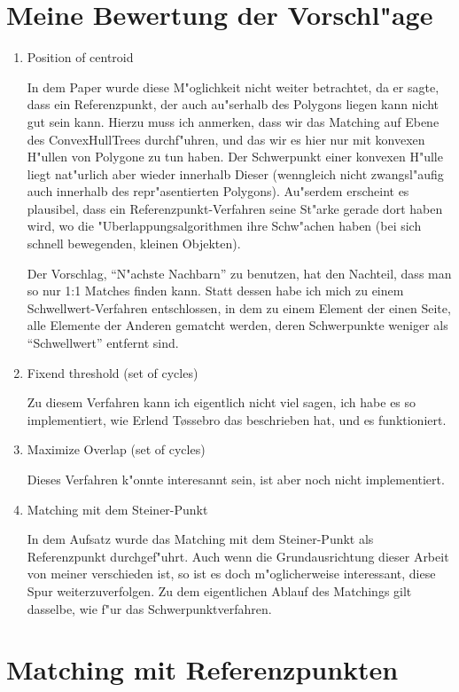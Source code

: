 \section{Meine Bewertung der Vorschl"age}
\begin{enumerate}
\item Position of centroid

In dem Paper wurde diese M"oglichkeit nicht weiter betrachtet, da er sagte, dass ein Referenzpunkt, der auch au"serhalb des Polygons liegen kann nicht gut sein kann. Hierzu muss ich anmerken, dass wir das Matching auf Ebene des ConvexHullTrees durchf"uhren, und das wir es hier nur mit konvexen H"ullen von Polygone zu tun haben. Der Schwerpunkt einer konvexen H"ulle liegt nat"urlich aber wieder innerhalb Dieser (wenngleich nicht zwangsl"aufig auch innerhalb des repr"asentierten Polygons). Au"serdem erscheint es plausibel, dass ein Referenzpunkt-Verfahren seine St"arke gerade dort haben wird, wo die "Uberlappungsalgorithmen ihre Schw"achen haben (bei sich schnell bewegenden, kleinen Objekten).

Der Vorschlag, "`N"achste Nachbarn"' zu benutzen, hat den Nachteil, dass man so nur 1:1 Matches finden kann. Statt dessen habe ich mich zu einem Schwellwert-Verfahren entschlossen, in dem zu einem Element der einen Seite, alle Elemente der Anderen gematcht werden, deren Schwerpunkte weniger als "`Schwellwert"' entfernt sind. 

\item Fixend threshold (set of cycles)

Zu diesem Verfahren kann ich eigentlich nicht viel sagen, ich habe es so implementiert, wie Erlend T\o{}ssebro das beschrieben hat, und es funktioniert.

\item Maximize Overlap (set of cycles)

Dieses Verfahren k"onnte interesannt sein, ist aber noch nicht implementiert.

\item Matching mit dem Steiner-Punkt

In dem Aufsatz \cite{AAR} wurde das Matching mit dem Steiner-Punkt als Referenzpunkt durchgef"uhrt. Auch wenn die Grundausrichtung dieser Arbeit von meiner verschieden ist, so ist es doch m"oglicherweise interessant, diese Spur weiterzuverfolgen. Zu dem eigentlichen Ablauf des Matchings gilt dasselbe, wie f"ur das Schwerpunktverfahren.
\end{enumerate}

\section{Matching mit Referenzpunkten}

